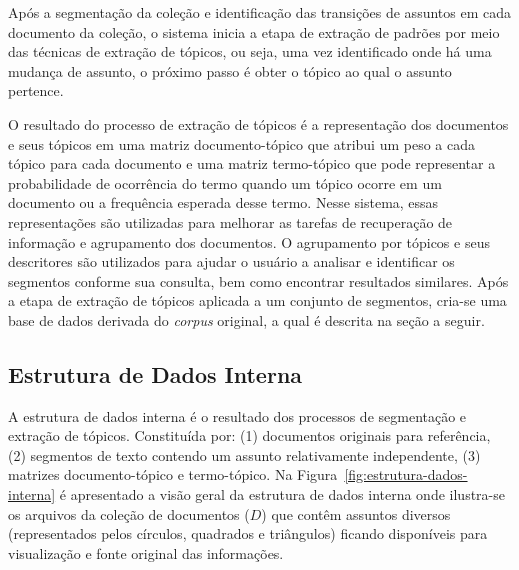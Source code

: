 Após a segmentação da coleção e identificação das transições de assuntos em cada documento da coleção, o sistema inicia a etapa de extração de padrões por meio das técnicas de extração de tópicos, ou seja, uma vez identificado onde há uma mudança de assunto, o próximo passo é obter o tópico ao qual o assunto pertence.

O resultado do processo de extração de tópicos é a representação dos documentos e seus tópicos em uma matriz documento-tópico que atribui um peso a cada tópico para cada documento e uma matriz termo-tópico que pode representar a probabilidade de ocorrência do termo quando um tópico ocorre em um documento ou a frequência esperada desse termo.  
Nesse sistema, essas representações são utilizadas para melhorar as tarefas de recuperação de informação e agrupamento dos documentos. 
O agrupamento por tópicos e seus descritores são utilizados para ajudar o usuário a analisar e identificar os segmentos conforme sua consulta, bem como encontrar resultados similares. 
Após a etapa de extração de tópicos aplicada a um conjunto de segmentos,  cria-se uma base de dados derivada do \textit{corpus} original, a qual é descrita na seção a seguir.








\subsection{Estrutura de Dados Interna}

A estrutura de dados interna é o resultado dos processos de segmentação e extração de tópicos. Constituída por: 
(1) documentos originais para referência, 
(2) segmentos de texto contendo um assunto relativamente independente,
(3) matrizes documento-tópico e termo-tópico.
Na Figura~\ref{fig:estrutura-dados-interna} é apresentado a visão geral da estrutura de dados interna onde ilustra-se os arquivos da coleção de documentos ($D$) que contêm assuntos diversos (representados pelos círculos, quadrados e triângulos) ficando disponíveis para visualização e fonte original das informações. 


